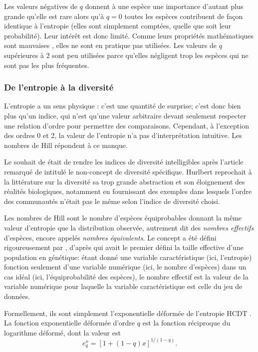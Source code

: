\documentclass[fleqn,10pt]{ArtEcoFoG} %
\begin{document}
Les valeurs négatives de \(q\) donnent à une espèce une importance
d'autant plus grande qu'elle est rare alors qu'à \(q=0\) toutes les
espèces contribuent de façon identique à l'entropie (elles sont
simplement comptées, quelle que soit leur probabilité). Leur intérêt est
donc limité. Comme leurs propriétés mathématiques sont mauvaises
\citep{Marcon2014a}, elles ne sont en pratique pas utilisées. Les
valeurs de \(q\) supérieures à 2 sont peu utilisées parce qu'elles
négligent trop les espèces qui ne sont pas les plus fréquentes.

\subsubsection{De l'entropie à la
diversité}\label{de-lentropie-a-la-diversite}

L'entropie a un sens physique : c'est une quantité de surprise; c'est
donc bien plus qu'un indice, qui n'est qu'une valeur arbitraire devant
seulement respecter une relation d'ordre pour permettre des
comparaisons. Cependant, à l'exception des ordres 0 et 2, la valeur de
l'entropie n'a pas d'interprétation intuitive. Les nombres de Hill
répondent à ce manque.

Le souhait de \citet{Hill1973} était de rendre les indices de diversité
intelligibles après l'article remarqué de \citet{Hurlbert1971} intitulé
\og le non-concept de diversité spécifique\fg{}. Hurlbert reprochait à
la littérature sur la diversité sa trop grande abstraction et son
éloignement des réalités biologiques, notamment en fournissant des
exemples dans lesquels l'ordre des communautés n'était pas le même selon
l'indice de diversité choisi.

Les nombres de Hill sont le nombre d'espèces équiprobables donnant la
même valeur d'entropie que la distribution observée, autrement dit des
\emph{nombres effectifs} d'espèces, encore appelés \emph{nombres
équivalents}. Le concept a été défini rigoureusement par
\citet{Gregorius1991}, d'après \citet{Wright1931} qui avait le premier
défini la taille effective d'une population en génétique: étant donné
une variable caractéristique (ici, l'entropie) fonction seulement d'une
variable numérique (ici, le nombre d'espèces) dans un cas idéal (ici,
l'équiprobabilité des espèces), le nombre effectif est la valeur de la
variable numérique pour laquelle la variable caractéristique est celle
du jeu de données.

Formellement, ils sont simplement l'exponentielle déformée de l'entropie
HCDT \citep{Marcon2014a}. La fonction exponentielle déformée d'ordre
\(q\) est la fonction réciproque du logarithme déformé, dont la valeur
est \[e^x_q = [1 + (1-q)x]^{1/(1-q)}.\]
\end{document}
